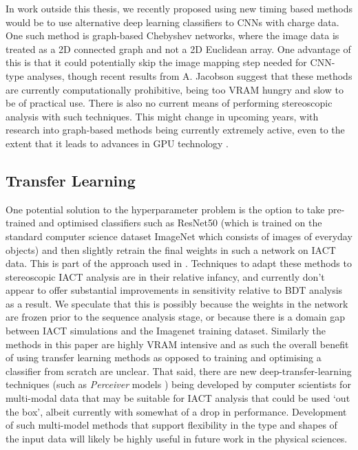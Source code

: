 In work outside this thesis, we recently proposed using new timing based methods would be to use alternative deep learning classifiers to CNNs with charge data. One such method is graph-based Chebyshev networks, where the image data is treated as a 2D connected graph and not a 2D Euclidean array. One advantage of this is that it could potentially skip the image mapping step needed for CNN-type analyses, though recent results from A. Jacobson \cite{adithesis} suggest that these methods are currently computationally prohibitive, being too VRAM hungry and slow to be of practical use. There is also no current means of performing stereoscopic analysis with such techniques. This might change in upcoming years, with research into graph-based methods being currently extremely active, even to the extent that it leads to advances in GPU technology  \cite{graphcore}.

\subsection{Transfer Learning}
One potential solution to the hyperparameter problem is the option to take pre-trained and optimised classifiers such as ResNet50 \cite{resnet50} (which is trained on the standard computer science dataset ImageNet \cite{ImageNet} which consists of images of everyday objects) and then slightly retrain the final weights in such a network on IACT data. This is part of the approach used in \cite{tjarkicrc}. Techniques to adapt these methods to stereoscopic IACT analysis are in their relative infancy, and currently don't appear to offer substantial improvements in sensitivity relative to BDT analysis as a result. We speculate that this is possibly because the weights in the network are frozen prior to the sequence analysis stage, or because there is a domain gap between IACT simulations and the Imagenet \cite{ImageNet} training dataset. Similarly the methods in this paper are highly VRAM intensive and as such the overall benefit of using transfer learning methods as opposed to training and optimising a classifier from scratch are unclear. That said, there are new deep-transfer-learning techniques (such as \textit{Perceiver} models \cite{perceiver}) being developed by computer scientists for multi-modal data that may be suitable for IACT analysis that could be used `out the box', albeit currently with somewhat of a drop in performance. Development of such multi-model methods that support flexibility in the type and shapes of the input data will likely be highly useful in future work in the physical sciences.

